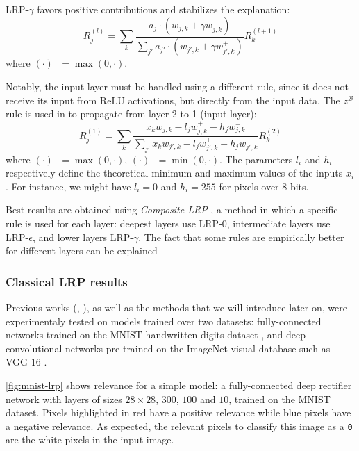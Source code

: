 \documentclass[twocolumn]{../cs-classes/cs-classes}
\newcommand*{\1}{\digitsbb{1}}
\newcommand*{\0}{\digitsbb{0}}
\begin{document}
LRP-$\gamma$ favors positive contributions and stabilizes the explanation:
\begin{equation*}
    \tag{LRP-$\gamma$}
    R^{(l)}_j = \sum_{k}\frac{a_j\cdot(w_{j, k} + \gamma w_{j,k}^+)}{\sum_{j'}a_{j'}\cdot(w_{j', k}+ \gamma w_{j',k}^+)} R^{(l+1)}_k
\end{equation*}
where $(\cdot)^+=\max(0, \cdot)$.

Notably, the input layer must be handled using a different rule, since it does not receive its input from ReLU activations, but directly from the input data. The $z^\mathcal{B}$ rule is used in \cite{montavon-lrp} to propagate from layer 2 to 1 (input layer):
\begin{equation}
    R^{(1)}_j = \sum_{k} \frac{x_kw_{j, k} - l_jw^+_{j, k} - h_jw_{j, k}^-}{\sum_{j'}x_kw_{j', k} - l_jw^+_{j', k} - h_jw_{j', k}^-} R^{(2)}_k
\end{equation}
where $(\cdot)^+=\max(0, \cdot)$, $(\cdot)^-=\min(0, \cdot)$. The parameters $l_i$ and $h_i$ respectively define the theoretical minimum and maximum values of the inputs $x_i$. For instance, we might have $l_i=0$ and $h_i=255$ for pixels over 8 bits.

Best results are obtained using \emph{Composite LRP} \cite{montavon-lrp}, a method in which a specific rule is used for each layer: deepest layers use LRP-0, intermediate layers use LRP-$\epsilon$, and lower layers LRP-$\gamma$. The fact that some rules are empirically better for different layers can be explained 

\subsubsection{Classical LRP results}
Previous works (\cite{bach-2015}, \cite{montavon-lrp}), as well as the methods that we will introduce later on, were experimentaly tested on models trained over two datasets: fully-connected networks trained on the MNIST handwritten digits dataset \cite{mnist-dataset}, and deep convolutional networks pre-trained on the ImageNet visual database such as VGG-16 \cite{vgg}.

\autoref{fig:mnist-lrp} shows relevance for a simple model: a fully-connected deep rectifier network with layers of sizes $28\times28$, $300$, $100$ and $10$, trained on the MNIST dataset. Pixels highlighted in red have a positive relevance while blue pixels have a negative relevance. As expected, the relevant pixels to classify this image as a \texttt{0} are the white pixels in the input image.
\end{document}
